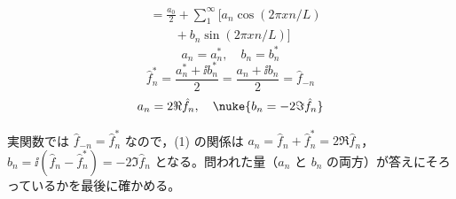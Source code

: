\begin{align*}
  &=\frac{a_0}{2}+\sum_{1}^{\infty}\bigl[a_n\cos(2\pi xn/L)\\
  &\qquad+b_n\sin(2\pi xn/L)\bigr]
\end{align*}
\[ a_n=a_n^{*},\quad b_n=b_n^{*} \]
\[ \hat{f}_n^{*}=\frac{a_n^{*}+\ii b_n^{*}}{2}=\frac{a_n+\ii b_n}{2}=\hat{f}_{-n} \]
\[ a_n=2\Re\hat{f}_n,\quad \nuke{b_n=-2\Im\hat{f}_n} \]
\item 実関数では $\hat{f}_{-n}=\hat{f}_n^{*}$ なので，(1) の関係は $a_n=\hat{f}_n+\hat{f}_n^{*}=2\Re\hat{f}_n$，$b_n=\ii(\hat{f}_n-\hat{f}_n^{*})=-2\Im\hat{f}_n$ となる。問われた量（$a_n$ と $b_n$ の両方）が答えにそろっているかを最後に確かめる。
